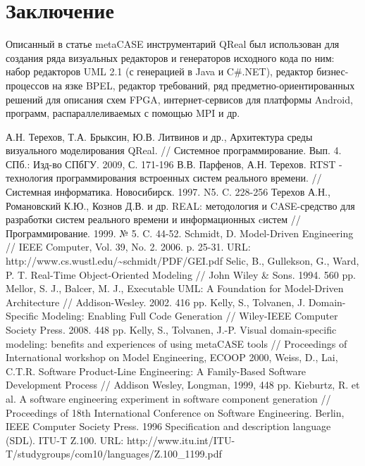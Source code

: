 \documentclass[a4paper]{article}
\begin{document}
\section{Заключение}

Описанный в статье metaCASE инструментарий QReal был использован для создания ряда визуальных редакторов и генераторов исходного кода по ним: набор редакторов UML 2.1 (с генерацией в Java и C\#.NET), редактор бизнес-процессов на язке BPEL, редактор требований, ряд предметно-ориентированных решений для описания схем FPGA, интернет-сервисов для платформы Android, программ, распараллеливаемых с помощью MPI и др.

\begin{thebibliography}{9001}
   А.Н. Терехов, Т.А. Брыксин, Ю.В. Литвинов и др., Архитектура среды визуального моделирования QReal. // Системное программирование. Вып. 4. СПб.: Изд-во СПбГУ. 2009, С. 171-196
   В.В. Парфенов, А.Н. Терехов. RTST - технология программирования встроенных систем реального времени. // Системная информатика. Новосибирск. 1997. N5. C. 228-256
   Терехов А.Н., Романовский К.Ю., Кознов Д.В. и др. REAL: методология и CASE-средство для разработки систем реального времени и информационных cистем // Программирование. 1999. № 5. C. 44-52.
   Schmidt, D. Model-Driven Engineering // IEEE Computer, Vol. 39, No. 2. 2006. p. 25-31. URL: http://www.cs.wustl.edu/\textasciitilde schmidt/PDF/GEI.pdf
   Selic, B., Gullekson, G., Ward, P. T. Real-Time Object-Oriented Modeling // John Wiley \& Sons. 1994. 560 pp.
   Mellor, S. J., Balcer, M. J., Executable UML: A Foundation for Model-Driven Architecture // Addison-Wesley. 2002. 416 pp.
   Kelly, S., Tolvanen, J. Domain-Specific Modeling: Enabling Full Code Generation // Wiley-IEEE Computer Society Press. 2008. 448 pp.
   Kelly, S., Tolvanen, J.-P. Visual domain-specific modeling: benefits and experiences of using metaCASE tools // Proceedings of International workshop on Model Engineering, ECOOP 2000, 
   Weiss, D., Lai, C.T.R. Software Product-Line Engineering: A Family-Based Software Development Process // Addison Wesley, Longman, 1999, 448 pp.	
   Kieburtz, R. et al. A software engineering experiment in software component generation // Proceedings of 18th International Conference on Software Engineering. Berlin, IEEE Computer Society Press. 1996
   Specification and description language (SDL). ITU-T Z.100. URL: http://www.itu.int/ITU-T/studygroups/com10/languages/Z.100\_1199.pdf

\end{thebibliography}
\end{document}

